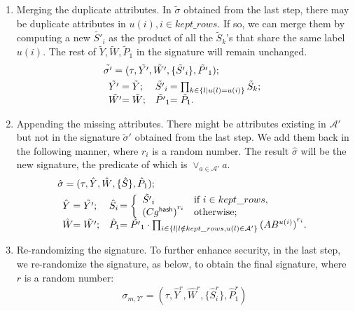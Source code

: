 \begin{enumerate}
  \item Merging the duplicate attributes. In $\tilde{\sigma}$ obtained from the last step, there may be duplicate attributes in $u(i), i \in kept\_rows$. If so, we can merge them by computing a new $\tilde{S'}_i$ as the product of all the $\tilde{S}_k$'s that share the same label $u(i)$. The rest of $\tilde{Y}, \tilde{W}, \tilde{P}_1$ in the signature will remain unchanged.
    \begin{align*}
              & \tilde{\sigma'} = (\tau,\tilde{Y'},\tilde{W'},\{\tilde{S'}_i\}, \tilde{P'}_1); \\
              & \begin{array}{l@{}ll@{}l}
                \tilde{Y'} & = \tilde{Y}; &
                \tilde{S'}_i & = \prod_{k \in \{l | u(l) = u(i)\}} \tilde{S}_k;
                \\
                \tilde{W'} & = \tilde{W}; &
                \tilde{P'}_1 & = \tilde{P}_1.
              \end{array}
    \end{align*}
  \item Appending the missing attributes. There might be attributes existing in $\mathcal{A}'$ but not in the signature $\tilde{\sigma}'$ obtained from the last step. We add them back in the following manner, where $r_i$ is a random number. The result $\hat{\sigma}$ will be the new signature, the predicate of which is $\lor_{a\in\mathcal{A}'}a$.
    \begin{align*}
              & \hat{\sigma} = (\tau,\hat{Y}, \hat{W}, \{\hat{S}\}, \hat{P}_1); \\
              & \begin{array}{l@{}ll@{}l}
                \hat{Y} & = \tilde{Y'}; &
                \hat{S}_i &= \left\{\begin{array}{ll}
                    \tilde{S'}_i & \text{if } i \in kept\_rows, \\
                    {(Cg^{\hash})}^{r_i}         & \text{otherwise};
                \end{array}\right.
                \\
                    \hat{W} & = \tilde{W'}; &
                    \hat{P}_1 &= \tilde{P'}_1 \cdot
                    \prod_{i \in\{l|l \notin{} kept\_rows, u(l) \in\mathcal{A}'\}}{(AB^{u(i)})}^{r_i}. %
                  \end{array}
    \end{align*}
  \item Re-randomizing the signature. To further enhance security, in the last step, we re-randomize the signature, as below, to obtain the final signature, where $r$ is a random number:
    \begin{align*}
      \sigma_{m,\Upsilon'} = (\tau,\hat{Y}^r, \hat{W}^r, \{\hat{S}_i^r\}, \hat{P}_1^r)
    \end{align*}
\end{enumerate}

